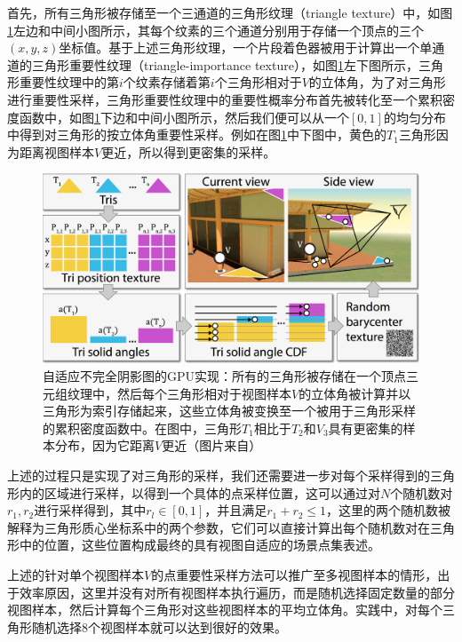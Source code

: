 首先，所有三角形被存储至一个三通道的三角形纹理（triangle texture）中，如图\ref{f:adaptive-ISMs}左边和中间小图所示，其每个纹素的三个通道分别用于存储一个顶点的三个$(x,y,z)$坐标值。基于上述三角形纹理，一个片段着色器被用于计算出一个单通道的三角形重要性纹理（triangle-importance texture），如图\ref{f:adaptive-ISMs}左下图所示，三角形重要性纹理中的第$i$个纹素存储着第$i$个三角形相对于$V$的立体角，为了对三角形进行重要性采样，三角形重要性纹理中的重要性概率分布首先被转化至一个累积密度函数中，如图\ref{f:adaptive-ISMs}下边和中间小图所示，然后我们便可以从一个$[0,1]$的均匀分布中得到对三角形的按立体角重要性采样。例如在图\ref{f:adaptive-ISMs}中下图中，黄色的$T_1$三角形因为距离视图样本$V$更近，所以得到更密集的采样。

\begin{figure}
	\includegraphics[width=1.\textwidth]{figures/ir/ir-5-4}
	\caption{自适应不完全阴影图的GPU实现：所有的三角形被存储在一个顶点三元组纹理中，然后每个三角形相对于视图样本$V$的立体角被计算并以三角形为索引存储起来，这些立体角被变换至一个被用于三角形采样的累积密度函数中。在图中，三角形$T_1$相比于$T_2$和$V_3$具有更密集的样本分布，因为它距离$V$更近（图片来自\cite{a:MakingImperfectShadowMapsViewAdaptive}）}
	\label{f:adaptive-ISMs}
\end{figure}

上述的过程只是实现了对三角形的采样，我们还需要进一步对每个采样得到的三角形内的区域进行采样，以得到一个具体的点采样位置，这可以通过对$N$个随机数对$r_1,r_2$进行采样得到，其中$r_l\in[0,1]$，并且满足$r_1+r_2\leq 1$，这里的两个随机数被解释为三角形质心坐标系中的两个参数，它们可以直接计算出每个随机数对在三角形中的位置，这些位置构成最终的具有视图自适应的场景点集表述。

上述的针对单个视图样本$V$的点重要性采样方法可以推广至多视图样本的情形，出于效率原因，这里并没有对所有视图样本执行遍历，而是随机选择固定数量的部分视图样本，然后计算每个三角形对这些视图样本的平均立体角。实践中，对每个三角形随机选择8个视图样本就可以达到很好的效果。

